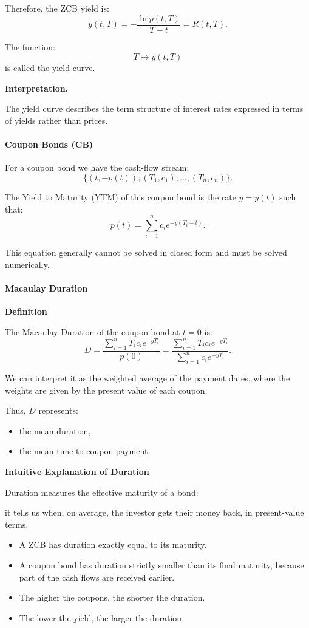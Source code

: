 \documentclass[12pt,a4paper]{article}
\theoremstyle{definition}
\begin{document}
Therefore, the ZCB yield is:
\[
y(t, T) = -\frac{\ln p(t, T)}{T - t} = R(t, T).
\]

The function:
\[
T \longmapsto y(t, T)
\]
is called the yield curve.

\textbf{Interpretation.}

The yield curve describes the term structure of interest rates expressed in terms of yields rather than prices.

\paragraph{Coupon Bonds (CB)}

For a coupon bond we have the cash-flow stream:
\[
\{(t, -p(t)); (T_1, c_1); \ldots; (T_n, c_n)\}.
\]

The Yield to Maturity (YTM) of this coupon bond is the rate $y = y(t)$ such that:
\[
p(t) = \sum_{i=1}^n c_i e^{-y(T_i - t)}.
\]

This equation generally cannot be solved in closed form and must be solved numerically.

\paragraph{Macaulay Duration}

\textbf{Definition}

The Macaulay Duration of the coupon bond at $t = 0$ is:
\[
D = \frac{\sum_{i=1}^n T_i c_i e^{-y T_i}}{p(0)} = \frac{\sum_{i=1}^n T_i c_i e^{-y T_i}}{\sum_{i=1}^n c_i e^{-y T_i}}.
\]

We can interpret it as the weighted average of the payment dates, where the weights are given by the present value of each coupon.

Thus, $D$ represents:

\begin{itemize}
\item the mean duration,
\item the mean time to coupon payment.
\end{itemize}

\textbf{Intuitive Explanation of Duration}

Duration measures the effective maturity of a bond:

it tells us when, on average, the investor gets their money back, in present-value terms.

\begin{itemize}
\item A ZCB has duration exactly equal to its maturity.

\item A coupon bond has duration strictly smaller than its final maturity, because part of the cash flows are received earlier.

\item The higher the coupons, the shorter the duration.

\item The lower the yield, the larger the duration.
\end{itemize}
\end{document}
